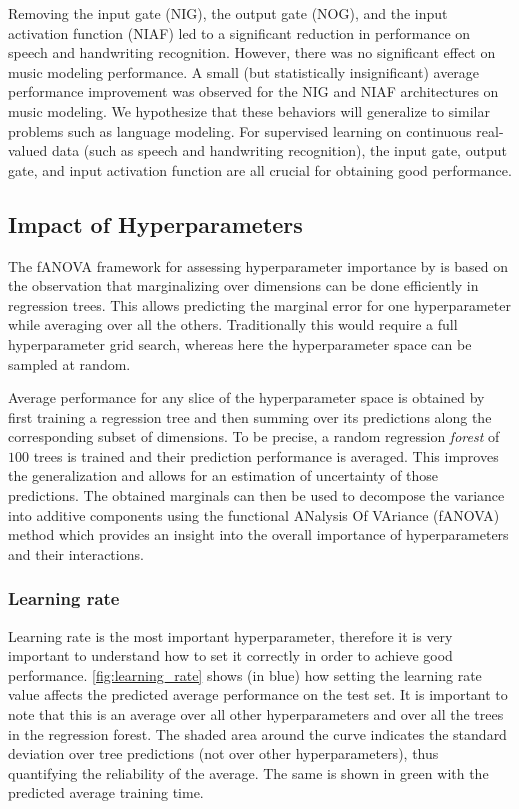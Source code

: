 Removing the input gate (NIG), the output gate (NOG), and the input activation function (NIAF) led to a significant reduction in performance on speech and handwriting recognition. However, there was no significant effect on music modeling performance. A small (but statistically insignificant) average performance improvement was observed for the NIG and NIAF architectures on music modeling. We hypothesize that these behaviors will generalize to similar problems such as language modeling. For supervised learning on continuous real-valued data (such as speech and handwriting recognition), the input gate, output gate, and input activation function are all crucial for obtaining good performance.

\subsection{Impact of Hyperparameters}
\label{sec:hyper-impact}
The fANOVA framework for assessing hyperparameter importance by \citet{Hutter2014} is based on the observation that marginalizing over dimensions can be done efficiently in regression trees. This allows predicting the marginal error for one hyperparameter while averaging over all the others. Traditionally this would require a full hyperparameter grid search, whereas here the hyperparameter space can be sampled at random. 

Average performance for any slice of the hyperparameter space is obtained by first training a regression tree and then summing over its predictions along the corresponding subset of dimensions. To be precise, a random regression \emph{forest} of $100$ trees is trained and their prediction performance is averaged. This improves the generalization and allows for an estimation of uncertainty of those predictions. The obtained marginals can then be used to decompose the variance into additive components using the functional ANalysis Of VAriance (fANOVA) method \cite{Hooker2007} which provides an insight into the overall importance of hyperparameters and their interactions.

\subsubsection*{Learning rate} Learning rate is the most important hyperparameter, therefore it is very important to understand how to set it correctly in order to achieve good performance. 
\autoref{fig:learning_rate} shows (in blue) how setting the learning rate value affects the predicted average performance on the test set. It is important to note that this is an average over all other hyperparameters and over all the trees in the regression forest. The shaded area around the curve indicates the standard deviation over tree predictions (not over other hyperparameters), thus quantifying the reliability of the average. The same is shown in green with the predicted average training time. 

